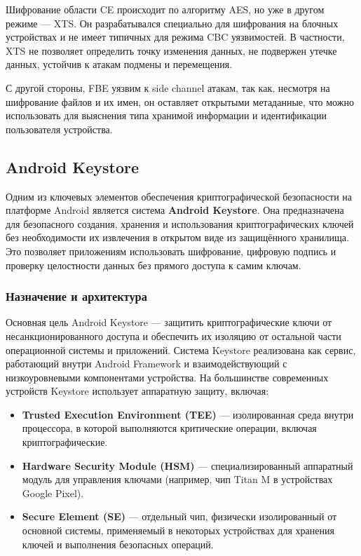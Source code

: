 Шифрование области CE происходит по алгоритму AES, но уже в другом режиме —
XTS. Он разрабатывался специально для шифрования на блочных устройствах и не
имеет типичных для режима CBC уязвимостей. В частности, XTS не позволяет
определить точку изменения данных, не подвержен утечке данных, устойчив к
атакам подмены и перемещения.

С другой стороны, FBE уязвим к side channel атакам, так как, несмотря на
шифрование файлов и их имен, он оставляет открытыми метаданные, что можно
использовать для выяснения типа хранимой информации и идентификации
пользователя устройства.

\subsection*{Android Keystore}

Одним из ключевых элементов обеспечения криптографической безопасности на
платформе Android является система \textbf{Android Keystore}. Она предназначена
для безопасного создания, хранения и использования криптографических ключей без
необходимости их извлечения в открытом виде из защищённого хранилища. Это
позволяет приложениям использовать шифрование, цифровую подпись и проверку
целостности данных без прямого доступа к самим ключам.

\subsubsection*{Назначение и архитектура}

Основная цель Android Keystore --- защитить криптографические ключи от
несанкционированного доступа и обеспечить их изоляцию от остальной части
операционной системы и приложений. Система Keystore реализована как сервис,
работающий внутри Android Framework и взаимодействующий с низкоуровневыми
компонентами устройства. На большинстве современных устройств Keystore
использует аппаратную защиту, включая:

\begin{itemize}
    \item \textbf{Trusted Execution Environment (TEE)} --- изолированная среда
    внутри процессора, в которой выполняются критические операции, включая
    криптографические.
    \item \textbf{Hardware Security Module (HSM)} --- специализированный
    аппаратный модуль для управления ключами (например, чип Titan M в
    устройствах Google Pixel).
    \item \textbf{Secure Element (SE)} --- отдельный чип, физически
    изолированный от основной системы, применяемый в некоторых устройствах для
    хранения ключей и выполнения безопасных операций.
\end{itemize}

